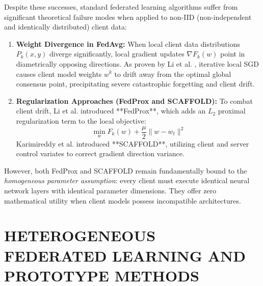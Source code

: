 \documentclass[12pt,a4paper]{amritareport}
\begin{document}
Despite these successes, standard federated learning algorithms suffer from significant theoretical failure modes when applied to non-IID (non-independent and identically distributed) client data:
\begin{enumerate}
	\item \textbf{Weight Divergence in FedAvg:} When local client data distributions $P_k(x, y)$ diverge significantly, local gradient updates $\nabla F_k(w)$ point in diametrically opposing directions. As proven by Li et al. \cite{li2020federated}, iterative local SGD causes client model weights $w^k$ to drift away from the optimal global consensus point, precipitating severe catastrophic forgetting and client drift.
	\item \textbf{Regularization Approaches (FedProx and SCAFFOLD):} To combat client drift, Li et al. \cite{li2020federated} introduced **FedProx**, which adds an $L_2$ proximal regularization term to the local objective:
	\begin{equation}
		\min_{w} F_k(w) + \frac{\mu}{2} \|w - w_t\|^2
	\end{equation}
	Karimireddy et al. \cite{karimireddy2020scaffold} introduced **SCAFFOLD**, utilizing client and server control variates to correct gradient direction variance.
\end{enumerate}

However, both FedProx and SCAFFOLD remain fundamentally bound to the \textit{homogeneous parameter assumption}: every client must execute identical neural network layers with identical parameter dimensions. They offer zero mathematical utility when client models possess incompatible architectures.


\section{HETEROGENEOUS FEDERATED LEARNING AND PROTOTYPE METHODS}
\end{document}
